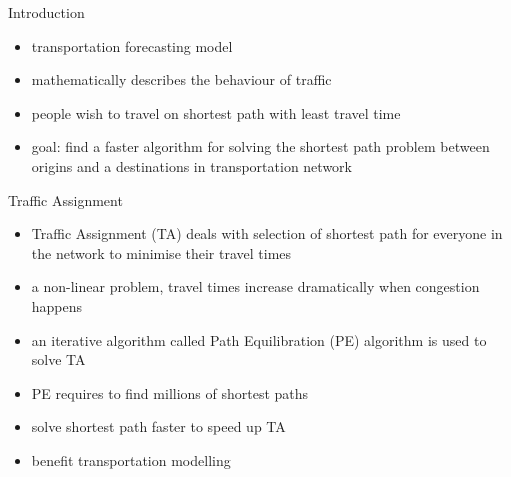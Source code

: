 \documentclass[final]{beamer}
\begin{document}
\begin{frame}{ }
    \begin{columns}[t]
        \begin{column}{.28\linewidth}

            \begin{block}{Introduction}
                \begin{itemize}
                    \itemsep.5em
                    \item transportation forecasting model
                    \item mathematically describes the behaviour of traffic
                    \item people wish to travel on shortest path with least travel time
                    \item \alert{goal}: find a \alert{faster} algorithm for solving the \alert{shortest path} problem between origins and a destinations in transportation network
                \end{itemize}
            \end{block}

            \hspace{25em}

            \begin{block}{Traffic Assignment}
                \begin{itemize}
                    \itemsep.5em
                    \item \alert{Traffic Assignment (TA)} deals with selection of \alert{shortest path} for everyone in the network to \alert{minimise} their \alert{travel times}
                    \item a \alert{non-linear} problem, travel times increase dramatically when \alert{congestion} happens
                    \item an \alert{iterative algorithm} called \alert{Path Equilibration (PE)} algorithm is used to solve TA
                    \item \alert{PE} requires to find \alert{millions} of \alert{shortest paths}
                    \item solve shortest path faster to speed up TA 
                    \item benefit transportation modelling
                \end{itemize}
            \end{block}

            \hspace{25em}


\end{column}
\end{columns}
\end{frame}
\end{document}
